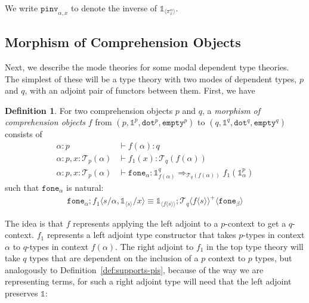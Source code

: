 \documentclass[10pt]{article}
\newtheorem{lemma}{Lemma}
\theoremstyle{definition}
\newtheorem{definition}{Definition}
\newcommand{\yields}{\vdash}
\newcommand{\tcell}{\Rightarrow}
\newcommand\TrPlus[2]{\ensuremath{{#1}^+(#2)}}
\newcommand\El[2]{\mathcal{T}_{#1}(#2)}
\newcommand\ApEl[2]{\mathcal{T}_{#1}\langle#2\rangle}
\newcommand\ap[2]{\ensuremath{#1 \langle #2 \rangle }}
\newcommand\ApPlus[2]{\ensuremath{{#1}^+ \langle #2 \rangle }}
\newcommand{\tdot}{\ensuremath{\mathtt{dot}}}
\newcommand{\tempty}{\ensuremath{\mathtt{empty}}}
\newcommand\One{\ensuremath{\mathds{1}}}
\newcommand\ApOne[1]{\ensuremath{\One_{\langle {#1} \rangle }}}
\newcommand\pinv[1]{\ensuremath{\mathtt{pinv}_{#1}}}
\newcommand\fone[1]{\ensuremath{\mathtt{fone}_{#1}}}
\begin{document}
We write $\pinv{\alpha,x}$ to denote the inverse of $\ApOne{\pi^\alpha_x}$.



\subsection{Morphism of Comprehension Objects}

Next, we describe the mode theories for some modal dependent type
theories.  The simplest of these will be a type theory with two modes of
dependent types, $p$ and $q$, with an adjoint pair of functors between
them.  First, we have

\begin{definition}\label{def:morphism-comprehension-object}
For two comprehension objects $p$ and $q$,
a \emph{morphism of comprehension objects} $f$ from $(p, \One^p, \tdot^p, \tempty^p)$ to $(q, \One^q, \tdot^q, \tempty^q)$ consists of 
\begin{align*}
\alpha : p &\yields f(\alpha) : q \\
\alpha : p, x : \El{p}{\alpha} &\yields f_1(x) : \El{q}{f(\alpha)} \\
\alpha : p, x : \El{p}{\alpha} &\yields \fone{\alpha} : \One^q_{f(\alpha)}  \tcell_{\El{q}{f(\alpha)}} f_1(\One^p_\alpha)
\end{align*}
such that $\fone{\alpha}$ is natural:
\begin{align}
\fone{\alpha};\ap{f_1}{s/\alpha, \ApOne{s}/x} \equiv \ApOne{\ap{f}{s}};\ApPlus{\ApEl{q}{\ap{f}{s}}}{\fone{\beta}}
\end{align}
\end{definition}

The idea is that $f$ represents applying the left adjoint to
a $p$-context to get a $q$-context.  $f_1$ represents a left adjoint
type constructor that takes $p$-types in context $\alpha$ to $q$-types
in context $f(\alpha)$.  The right adjoint to $f_1$ in the top
type theory will take $q$ types that are dependent on the inclusion of a
$p$ context to $p$ types, but analogously to
Definition~\ref{def:supports-pis}, because of the way we are
representing terms, for such a right adjoint type will need that the
left adjoint preserves $\One$:
\end{document}
